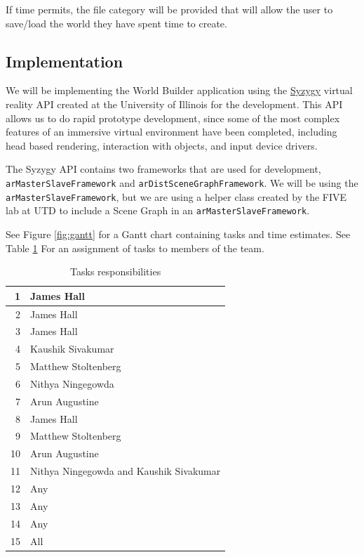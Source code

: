 If time permits, the file category will be provided that will allow the user to save/load the world they have spent time to create.

\subsection{Implementation}
We will be implementing the World Builder application using the \href{http://syzygy.isl.uiuc.edu/szg/szgsrc/doc/index.html}{Syzygy} virtual reality API created at the University of Illinois for the development.
This API allows us to do rapid prototype development, since some of the most complex features of an immersive virtual environment have been completed, including head based rendering, interaction with objects, and input device drivers.

The Syzygy API contains two frameworks that are used for development, \verb|arMasterSlaveFramework| and \verb|arDistSceneGraphFramework|.
We will be using the \verb|arMasterSlaveFramework|, but we are using a helper class created by the FIVE lab at UTD to include a Scene Graph in an \verb|arMasterSlaveFramework|.

See Figure \ref{fig:gantt} for a Gantt chart containing tasks and time estimates.
See Table \ref{tab:responsibilities} For an assignment of tasks to members of the team.

\begin{table}
	\begin{tabular}{|r||l|}
		\hline
		1 & James Hall \\ \hline
		2 & James Hall \\ \hline
		3 & James Hall \\ \hline
		4 & Kaushik Sivakumar \\ \hline
		5 & Matthew Stoltenberg \\ \hline
		6 & Nithya Ningegowda \\ \hline
		7 & Arun Augustine \\ \hline
		8	& James Hall \\ \hline
		9 & Matthew Stoltenberg \\ \hline
		10 & Arun Augustine \\ \hline
		11 & Nithya Ningegowda and Kaushik Sivakumar \\ \hline
		12 & Any \\ \hline
		13 & Any \\ \hline
		14 & Any \\ \hline
		15 & All \\ \hline
	\end{tabular}
	\caption{Tasks responsibilities}
	\label{tab:responsibilities}
\end{table}

